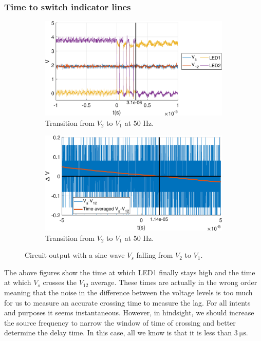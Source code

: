 \documentclass{article}
\begin{document}
\subsubsection{Time to switch indicator lines}
\begin{figure}[H]
	\centering
	\begin{subfigure}{.5\linewidth}
		\centering
		\includegraphics[keepaspectratio,width=.96\linewidth]{50hz_zoom.eps}
		\caption{Transition from $V_2$ to $V_1$ at 50 Hz.}
	\end{subfigure}%
	\begin{subfigure}{.5\linewidth}
		\centering
		\includegraphics[keepaspectratio,width=.96\linewidth]{50hz_avg_diff.eps}
		\caption{Transition from $V_2$ to $V_1$ at 50 Hz.}
	\end{subfigure}
	\caption{Circuit output with a sine wave $V_s$ falling from $V_2$ to $V_1$.}
\end{figure}
The above figures show the time at which LED1 finally stays high and the time at which $V_s$ crosses the $V_{12}$ average. These times are actually in the wrong order meaning that the noise in the difference between the voltage levels is too much for us to measure an accurate crossing time to measure the lag. For all intents and purposes it seems instantaneous. However, in hindsight, we should increase the source frequency to narrow the window of time of crossing and better determine the delay time. In this case, all we know is that it is less than $\SI{3}{\micro\second}$.
\end{document}
